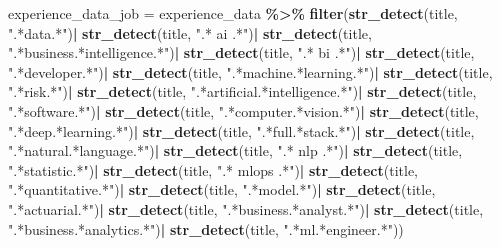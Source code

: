 \documentclass[11pt,]{article}
\newenvironment{Shaded}{\begin{snugshade}}{\end{snugshade}}
\newcommand{\FunctionTok}[1]{\textcolor[rgb]{0.13,0.29,0.53}{\textbf{#1}}}
\newcommand{\NormalTok}[1]{#1}
\newcommand{\OtherTok}[1]{\textcolor[rgb]{0.56,0.35,0.01}{#1}}
\newcommand{\SpecialCharTok}[1]{\textcolor[rgb]{0.81,0.36,0.00}{\textbf{#1}}}
\newcommand{\StringTok}[1]{\textcolor[rgb]{0.31,0.60,0.02}{#1}}
\begin{document}
\begin{Shaded}
\begin{Highlighting}[]
\NormalTok{experience\_data\_job }\OtherTok{=}\NormalTok{ experience\_data }\SpecialCharTok{\%\textgreater{}\%} 
  \FunctionTok{filter}\NormalTok{(}\FunctionTok{str\_detect}\NormalTok{(title, }\StringTok{".*data.*"}\NormalTok{)}\SpecialCharTok{|}
         \FunctionTok{str\_detect}\NormalTok{(title, }\StringTok{".* ai .*"}\NormalTok{)}\SpecialCharTok{|}
         \FunctionTok{str\_detect}\NormalTok{(title, }\StringTok{".*business.*intelligence.*"}\NormalTok{)}\SpecialCharTok{|}
         \FunctionTok{str\_detect}\NormalTok{(title, }\StringTok{".* bi .*"}\NormalTok{)}\SpecialCharTok{|}
         \FunctionTok{str\_detect}\NormalTok{(title, }\StringTok{".*developer.*"}\NormalTok{)}\SpecialCharTok{|}
         \FunctionTok{str\_detect}\NormalTok{(title, }\StringTok{".*machine.*learning.*"}\NormalTok{)}\SpecialCharTok{|}
         \FunctionTok{str\_detect}\NormalTok{(title, }\StringTok{".*risk.*"}\NormalTok{)}\SpecialCharTok{|}
         \FunctionTok{str\_detect}\NormalTok{(title, }\StringTok{".*artificial.*intelligence.*"}\NormalTok{)}\SpecialCharTok{|}
         \FunctionTok{str\_detect}\NormalTok{(title, }\StringTok{".*software.*"}\NormalTok{)}\SpecialCharTok{|}
         \FunctionTok{str\_detect}\NormalTok{(title, }\StringTok{".*computer.*vision.*"}\NormalTok{)}\SpecialCharTok{|}
         \FunctionTok{str\_detect}\NormalTok{(title, }\StringTok{".*deep.*learning.*"}\NormalTok{)}\SpecialCharTok{|}
         \FunctionTok{str\_detect}\NormalTok{(title, }\StringTok{".*full.*stack.*"}\NormalTok{)}\SpecialCharTok{|}
         \FunctionTok{str\_detect}\NormalTok{(title, }\StringTok{".*natural.*language.*"}\NormalTok{)}\SpecialCharTok{|}
         \FunctionTok{str\_detect}\NormalTok{(title, }\StringTok{".* nlp .*"}\NormalTok{)}\SpecialCharTok{|}
         \FunctionTok{str\_detect}\NormalTok{(title, }\StringTok{".*statistic.*"}\NormalTok{)}\SpecialCharTok{|}
         \FunctionTok{str\_detect}\NormalTok{(title, }\StringTok{".* mlops .*"}\NormalTok{)}\SpecialCharTok{|}
         \FunctionTok{str\_detect}\NormalTok{(title, }\StringTok{".*quantitative.*"}\NormalTok{)}\SpecialCharTok{|}
         \FunctionTok{str\_detect}\NormalTok{(title, }\StringTok{".*model.*"}\NormalTok{)}\SpecialCharTok{|}
         \FunctionTok{str\_detect}\NormalTok{(title, }\StringTok{".*actuarial.*"}\NormalTok{)}\SpecialCharTok{|}
         \FunctionTok{str\_detect}\NormalTok{(title, }\StringTok{".*business.*analyst.*"}\NormalTok{)}\SpecialCharTok{|}
         \FunctionTok{str\_detect}\NormalTok{(title, }\StringTok{".*business.*analytics.*"}\NormalTok{)}\SpecialCharTok{|}
         \FunctionTok{str\_detect}\NormalTok{(title, }\StringTok{".*ml.*engineer.*"}\NormalTok{))}
\end{Highlighting}
\end{Shaded}
\end{document}
